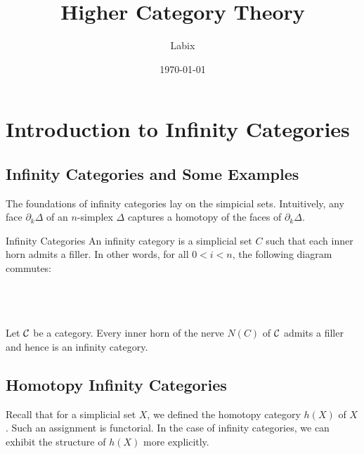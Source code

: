 \documentclass[a4paper]{article}
\title{Higher Category Theory}
\author{Labix}
\date{\today}
\begin{document}
\maketitle
\begin{abstract}
\begin{itemize}
\end{itemize}
\end{abstract}
\pagebreak
\tableofcontents

\pagebreak
\section{Introduction to Infinity Categories}
\subsection{Infinity Categories and Some Examples}
The foundations of infinity categories lay on the simpicial sets. Intuitively, any face $\partial_k\Delta$ of an $n$-simplex $\Delta$ captures a homotopy of the faces of $\partial_k\Delta$. 

\begin{defn}{Infinity Categories}{} An infinity category is a simplicial set $C$ such that each inner horn admits a filler. In other words, for all $0<i<n$, the following diagram commutes: \\~\\
\\~\\
\end{defn}

\begin{thm}{}{} Let $\mathcal{C}$ be a category. Every inner horn of the nerve $N(C)$ of $\mathcal{C}$ admits a filler and hence is an infinity category. 
\end{thm}

\subsection{Homotopy Infinity Categories}
Recall that for a simplicial set $X$, we defined the homotopy category $h(X)$ of $X$. Such an assignment is functorial. In the case of infinity categories, we can exhibit the structure of $h(X)$ more explicitly. 
\end{document}
